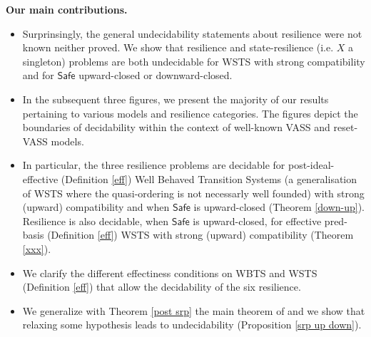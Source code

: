 \documentclass[runningheads]{llncs}
\newcommand{\pred}{\textsf{pred}}
\newcommand{\post}{\textsf{post}}
\newcommand{\Safe}{\textsf{Safe}}
\begin{document}
\noindent
{\bf Our main contributions.}
\begin{itemize}
\item Surprinsingly, the general undecidability statements about resilience were not known neither proved. We show that resilience and {state-resilience} (i.e. $X$ a singleton) problems are both undecidable for WSTS with strong compatibility and for $\Safe$ upward-closed or downward-closed.
%
\item In the subsequent three figures, we present the majority of our results pertaining to various models and resilience categories. The figures depict the boundaries of decidability within the context of well-known VASS and reset-VASS models.
%
\item In particular, the three resilience problems are decidable for post-ideal-effective (Definition \ref{eff}) Well Behaved Transition Systems (a generalisation of WSTS where the quasi-ordering is not necessarly well founded) with strong (upward) compatibility and when $\Safe$ is upward-closed (Theorem \ref{down-up}). Resilience is also decidable, when 
$\Safe$ is upward-closed, for effective pred-basis (Definition \ref{eff}) WSTS with strong (upward) compatibility (Theorem \ref{xxx}).
%
%
%
%
\item We clarify the different effectiness conditions on WBTS and WSTS (Definition \ref{eff}) that allow the decidability of the six resilience.
%
\item We generalize with Theorem \ref{post srp} the main theorem of \cite{DBLP:journals/corr/abs-2108-00889,DBLP:conf/gg/Ozkan22} and we show that relaxing some hypothesis leads to undecidability (Proposition \ref{srp up down}).
%
%


\end{itemize}
\end{document}
